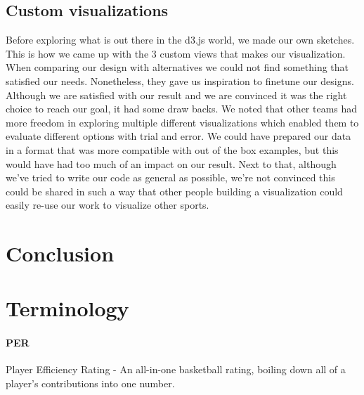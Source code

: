 \documentclass{sigchi}
\begin{document}
\subsection{Custom visualizations}
Before exploring what is out there in the d3.js world, we made our own sketches. This is how we came up with the 3 custom views that makes our visualization. When comparing our design with alternatives we could not find something that satisfied our needs. Nonetheless, they gave us inspiration to finetune our designs. Although we are satisfied with our result and we are convinced it was the right choice to reach our goal, it had some draw backs.
We noted that other teams had more freedom in exploring multiple different visualizations which enabled them to evaluate different options with trial and error. We could have prepared our data in a format that was more compatible with out of the box examples, but this would have had too much of an impact on our result.
Next to that, although we've tried to write our code as general as possible, we're not convinced this could be shared in such a way that other people building a visualization could easily re-use our work to visualize other sports.

\section{Conclusion}\label{sec:conclusion}


%
%
%
%
%
\balance{}

%
\printbibliography

\appendix
\section{Terminology}\label{sec:terminology}

\paragraph{PER} Player Efficiency Rating - An all-in-one basketball rating,
boiling down all of a player's contributions into one number\cite{per}.
\end{document}
